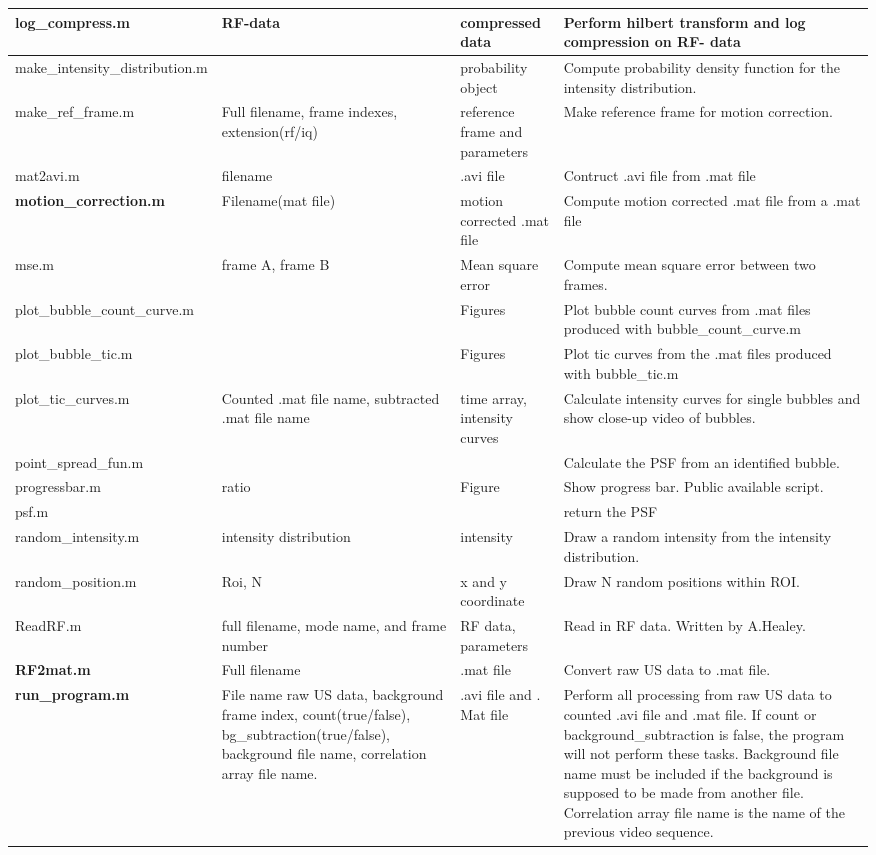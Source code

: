 \begin{center}
\begin{longtable}{@{} p{3cm} p{3cm} p{2cm} p{4cm} @{}}
			log\_compress.m & RF-data & compressed data & Perform hilbert transform and log  compression on RF- data \\ \hline 
			make\_intensity\_distribution.m &  & probability object & Compute probability density function for the intensity distribution. \\ \hline 
			make\_ref\_frame.m & Full filename, frame indexes, extension(rf/iq) & reference frame and parameters & Make reference frame for motion correction. \\ \hline 
			mat2avi.m & filename & .avi file & Contruct .avi file from .mat file \\ \hline 
			\textbf{motion\_correction.m} & Filename(mat file) & motion corrected .mat file & Compute motion corrected .mat file from a .mat file \\ \hline 
			mse.m & frame A, frame B & Mean square error & Compute mean square error between two frames. \\ \hline 
			plot\_bubble\_count\_curve.m &  & Figures & Plot bubble count curves from .mat files produced with bubble\_count\_curve.m \\ \hline 
			plot\_bubble\_tic.m &  & Figures & Plot tic curves from the .mat files produced with bubble\_tic.m \\ \hline 
			plot\_tic\_curves.m & Counted .mat file name, subtracted .mat file name & time array, intensity curves & Calculate intensity curves for single bubbles and show close-up video of bubbles. \\ \hline 
			point\_spread\_fun.m &  &  & Calculate the PSF from an identified bubble. \\ \hline 
			progressbar.m & ratio & Figure & Show progress bar.  Public available script. \\ \hline 
			psf.m &  &  & return the PSF \\ \hline 
			random\_intensity.m & intensity distribution & intensity & Draw a random intensity from the intensity distribution. \\ \hline 
			random\_position.m & Roi, N & x and y coordinate & Draw N random positions within ROI. \\ \hline 
			ReadRF.m & full filename, mode name, and frame number & RF data, parameters & Read in RF data. Written by A.Healey. \\ \hline 
			\textbf{RF2mat.m} & Full filename & .mat file & Convert raw US data to .mat file. \\ \hline 
			\textbf{run\_program.m} & File name raw US data, background frame index, count(true/false), bg\_subtraction(true/false),  background file name, correlation array file name. & .avi file and . Mat file & Perform all processing from raw US data to counted .avi file and .mat file. If count or background\_subtraction is false, the program will not perform these tasks. Background file name must be included if the background is supposed to be made from another file. Correlation array file name is the name of the previous video sequence. \\ \hline 

\end{longtable}
\end{center}
